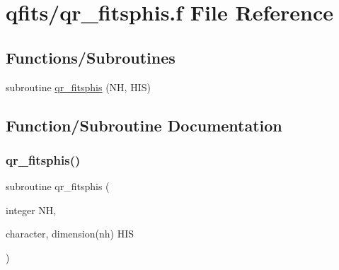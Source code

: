 \hypertarget{qr__fitsphis_8f}{}\section{qfits/qr\+\_\+fitsphis.f File Reference}
\label{qr__fitsphis_8f}
\subsection*{Functions/\+Subroutines}
\begin{DoxyCompactItemize}
\item 
subroutine \hyperlink{qr__fitsphis_8f_a77b20f7cc89bf2767b960247eab1f556}{qr\+\_\+fitsphis} (NH, H\+IS)
\end{DoxyCompactItemize}


\subsection{Function/\+Subroutine Documentation}
\mbox{\label{qr__fitsphis_8f_a77b20f7cc89bf2767b960247eab1f556}} 
\subsubsection{\texorpdfstring{qr\+\_\+fitsphis()}{qr\_fitsphis()}}
{\footnotesize\ttfamily subroutine qr\+\_\+fitsphis (\begin{DoxyParamCaption}\item[{integer}]{NH,  }\item[{character, dimension(nh)}]{H\+IS }\end{DoxyParamCaption})}

